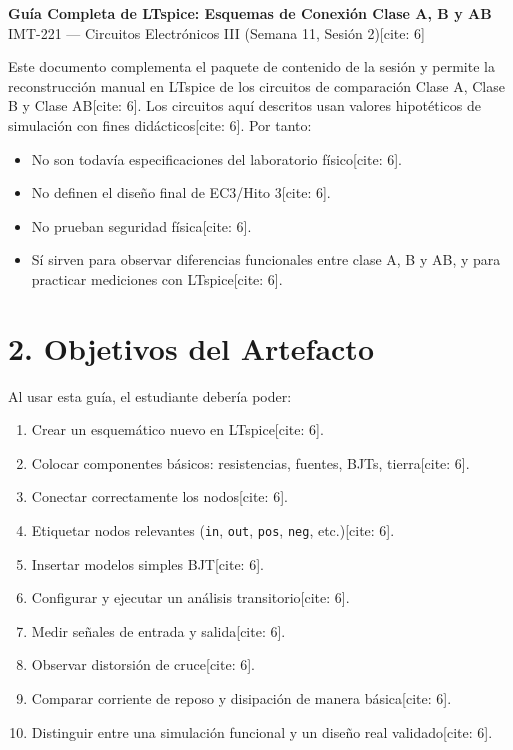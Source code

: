 \documentclass[11pt, a4paper]{article}
\begin{document}
\begin{center}
    {\Large \textbf{Guía Completa de LTspice: Esquemas de Conexión Clase A, B y AB\\[0.2cm]}}
    {\large IMT-221 — Circuitos Electrónicos III (Semana 11, Sesión 2)[cite: 6]}
\end{center}

\begin{tcolorbox}[colback=ucbblue!5, colframe=ucbblue, title=\textbf{1. Alcance y Advertencia Pedagógica {[cite: 6]}}]
    Este documento complementa el paquete de contenido de la sesión y permite la reconstrucción manual en LTspice de los circuitos de comparación Clase A, Clase B y Clase AB[cite: 6].
    Los circuitos aquí descritos usan valores hipotéticos de simulación con fines didácticos[cite: 6]. Por tanto:
    \begin{itemize}
        \item No son todavía especificaciones del laboratorio físico[cite: 6].
        \item No definen el diseño final de EC3/Hito 3[cite: 6].
        \item No prueban seguridad física[cite: 6].
        \item Sí sirven para observar diferencias funcionales entre clase A, B y AB, y para practicar mediciones con LTspice[cite: 6].
    \end{itemize}
\end{tcolorbox}

\section*{2. Objetivos del Artefacto}
Al usar esta guía, el estudiante debería poder:
\begin{enumerate}
    \item Crear un esquemático nuevo en LTspice[cite: 6].
    \item Colocar componentes básicos: resistencias, fuentes, BJTs, tierra[cite: 6].
    \item Conectar correctamente los nodos[cite: 6].
    \item Etiquetar nodos relevantes (\texttt{in}, \texttt{out}, \texttt{pos}, \texttt{neg}, etc.)[cite: 6].
    \item Insertar modelos simples BJT[cite: 6].
    \item Configurar y ejecutar un análisis transitorio[cite: 6].
    \item Medir señales de entrada y salida[cite: 6].
    \item Observar distorsión de cruce[cite: 6].
    \item Comparar corriente de reposo y disipación de manera básica[cite: 6].
    \item Distinguir entre una simulación funcional y un diseño real validado[cite: 6].
\end{enumerate}
\end{document}
